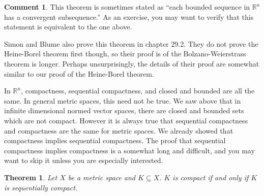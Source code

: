 \documentclass[12pt,reqno]{amsart}
\newtheorem{theorem}{Theorem}[section]
\theoremstyle{definition}
\newtheorem{remark}{Comment}[section]
\def\R{\mathbb{R}}
\begin{document}
\begin{remark}
  This theorem is sometimes stated as ``each bounded sequence in $\R^n$
  has a convergent subsequence.'' As an exercise, you may want to
  verify that this statement is equivalent to the one above.
\end{remark}
Simon and Blume also prove this theorem in chapter 29.2. They do not
prove the Heine-Borel theorem first though, so their proof is of the
Bolzano-Weierstrass theorem is longer. Perhaps unsurprisingly, the
details of their proof are somewhat similar to our proof of the
Heine-Borel theorem.

In $\R^n$, compactness, sequential compactness, and closed and bounded
are all the same. In general metric spaces, this need not be true. We
saw above that in infinite dimensional normed vector spaces, there are
closed and bounded sets which are not compact.  However it is always
true that sequential compactness and compactness are the same for
metric spaces. We already showed that compactness implies sequential
compactness.  The proof that sequential compactness implies
compactness is a somewhat long and difficult, and you may want to skip
it unless you are especially interested.
\begin{theorem}
  Let $X$ be a metric space and $K \subseteq X$. $K$ is compact if and
  only if $K$ is sequentially compact. 
\end{theorem}
\end{document}
